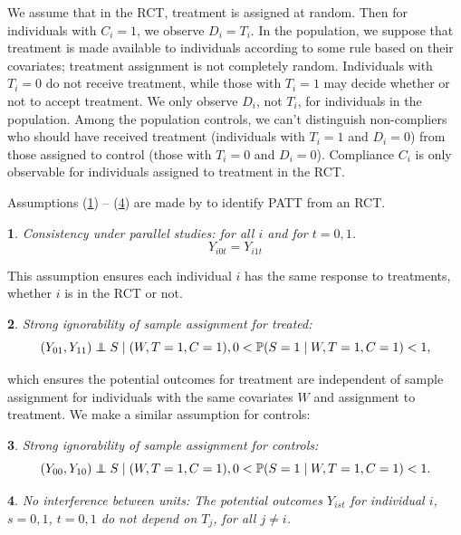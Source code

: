 \documentclass[12pt]{article}
\makeatletter
\newtheorem*{assumption*}{\assumptionnumber}
\providecommand{\assumptionnumber}{}
\newenvironment{assumption}[2]
 {%
  \renewcommand{\assumptionnumber}{Assumption #1}%
  \begin{assumption*}%
  \protected@edef\@currentlabel{#1}%
 }
 {%
  \end{assumption*}
 }
\newcommand{\pr}{\mathbb{P}} %
\newcommand\independent{\protect\mathpalette{\protect\independenT}{\perp}}
\def\independenT#1#2{\mathrel{\rlap{$#1#2$}\mkern2mu{#1#2}}}
\makeatother
\begin{document}
We assume that in the RCT, treatment is assigned at random.  Then for individuals with $C_i = 1$, we observe $D_i = T_i$.  In the population, we suppose that treatment is made available to individuals according to some rule based on their covariates; treatment assignment is not completely random. Individuals with $T_i = 0$ do not receive treatment, while those with $T_i=1$ may decide whether or not to accept treatment.  We only observe $D_i$, not $T_i$, for individuals in the population.  Among the population controls, we can't distinguish non-compliers who should have received treatment (individuals with $T_i=1$ and $D_i = 0$) from those assigned to control (those with $T_i = 0$ and $D_i = 0$).  Compliance $C_i$ is only observable for individuals assigned to treatment in the RCT. 

Assumptions (\ref{consistency}) -- (\ref{sutva}) are made by \cite{Hartman} to identify PATT from an RCT. 

\begin{assumption}{1}{}\label{consistency}
Consistency under parallel studies: for all $i$ and for $t=0, 1$.
$$Y_{i0t} = Y_{i1t}$$
\end{assumption}

\noindent This assumption ensures each individual $i$ has the same response to treatments, whether $i$ is in the RCT or not. 

\begin{assumption}{2}{}\label{si_treat}
Strong ignorability of sample assignment for treated:
\begin{equation*}
(Y_{01}, Y_{11}) \independent S \mid (W, T=1,C = 1), 0 < \pr(S=1 \mid W, T=1,C = 1) <1, 
\end{equation*}
\end{assumption}
\noindent which ensures the potential outcomes for treatment are independent of sample assignment for individuals with the same covariates $W$ and assignment to treatment. We make a similar assumption for controls: 

\begin{assumption}{3}{}\label{si_ctrl}
Strong ignorability of sample assignment for controls:
\begin{equation*}
(Y_{00}, Y_{10}) \independent S \mid (W, T=1,C = 1), 0 < \pr(S=1 \mid W, T=1,C = 1) <1. 
\end{equation*}\end{assumption}
 
\begin{assumption}{4}{}\label{sutva}
No interference between units: The potential outcomes $Y_{ist}$ for individual $i$, $s = 0,1$, $t=0,1$ do not depend on $T_j$, for all $j\neq i$. 

\end{assumption} 
\end{document}
